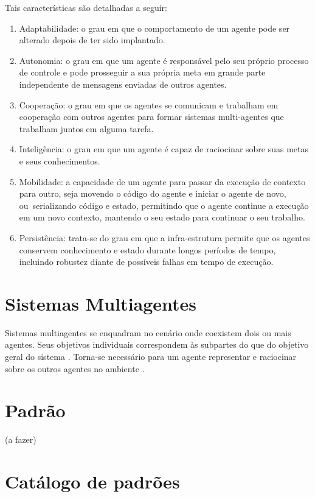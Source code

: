 Tais características são detalhadas a seguir:

\begin{enumerate}
    \item Adaptabilidade: o grau em que o comportamento de um agente pode ser alterado depois de ter sido implantado.
    \item Autonomia: o grau em que um agente é responsável pelo seu próprio processo de controle e pode prosseguir a sua própria meta em grande parte independente de mensagens enviadas de outros agentes.
    \item Cooperação: o grau em que os agentes se comunicam e trabalham em cooperação com outros agentes para formar sistemas multi-agentes que trabalham juntos em alguma tarefa.
    \item Inteligência: o grau em que um agente é capaz de raciocinar sobre suas metas e seus conhecimentos.
    \item Mobilidade: a capacidade de um agente para passar da execução de contexto para outro, seja movendo o código do agente e iniciar o agente de novo, ou serializando código e estado, permitindo que o agente continue a execução em um novo contexto, mantendo o seu estado para continuar o seu trabalho.
    \item Persistência: trata-se do grau em que a infra-estrutura permite que os agentes conservem conhecimento e estado durante longos períodos de tempo, incluindo robustez diante de possíveis falhas em tempo de execução.
\end{enumerate}

\section{Sistemas Multiagentes}

Sistemas multiagentes se enquadram no cenário onde coexistem dois ou mais agentes. Seus objetivos individuais  correspondem às subpartes do que do objetivo geral do sistema \cite{mcarthur2007multi}. Torna-se necessário para um agente representar e raciocinar sobre os outros agentes no ambiente \cite[pág. 887]{van2008handbook}. 


\section{Padrão}

(a fazer)

\section{Catálogo de padrões}

